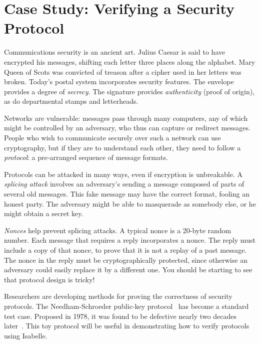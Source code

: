 \chapter{Case Study: Verifying a Security Protocol}
\label{chap:crypto}


\def\lbb{\mathopen{\{\kern-.30em|}}
\def\rbb{\mathclose{|\kern-.32em\}}}
\def\comp#1{\lbb#1\rbb}

Communications security is an ancient art.  Julius Caesar is said to have
encrypted his messages, shifting each letter three places along the
alphabet.  Mary Queen of Scots was convicted of treason after a cipher used
in her letters was broken.  Today's postal system
incorporates security features.  The envelope provides a degree of
\emph{secrecy}.  The signature provides \emph{authenticity} (proof of
origin), as do departmental stamps and letterheads.

Networks are vulnerable: messages pass through many computers, any of which
might be controlled by an adversary, who thus can capture or redirect
messages.  People who wish to communicate securely over such a network can
use cryptography, but if they are to understand each other, they need to
follow a
\emph{protocol}: a pre-arranged sequence of message formats. 

Protocols can be attacked in many ways, even if encryption is unbreakable. 
A \emph{splicing attack} involves an adversary's sending a message composed
of parts of several old messages.  This fake message may have the correct
format, fooling an honest party.  The adversary might be able to masquerade
as somebody else, or he might obtain a secret key.

\emph{Nonces} help prevent splicing attacks. A typical nonce is a 20-byte
random number. Each message that requires a reply incorporates a nonce. The
reply must include a copy of that nonce, to prove that it is not a replay of
a past message.  The nonce in the reply must be cryptographically
protected, since otherwise an adversary could easily replace it by a
different one. You should be starting to see that protocol design is
tricky!

Researchers are developing methods for proving the correctness of security
protocols.  The Needham-Schroeder public-key
protocol~\cite{needham-schroeder} has become a standard test case. 
Proposed in 1978, it was found to be defective nearly two decades
later~\cite{lowe-fdr}.  This toy protocol will be useful in demonstrating
how to verify protocols using Isabelle.


